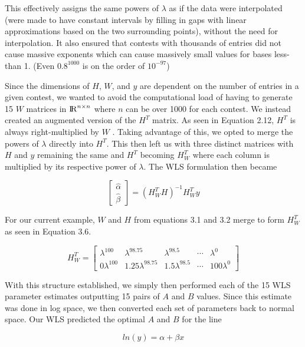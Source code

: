 This effectively assigns the same powers of $\lambda$ as if the data were interpolated (were made to have constant intervals by filling in gaps with linear approximations based on the two surrounding points), without the need for interpolation. It also ensured that contests with thousands of entries did not cause massive exponents which can cause massively small values for bases less-than 1. (Even $0.8^{1000}$ is on the order of $10^{-97}$)

Since the dimensions of $H$, $W$, and $y$ are dependent on the number of entries in a given contest, we wanted to avoid the computational load of having to generate 15 $W$ matrices in ${\rm I\!R}^{n \times n}$ where $n$ can be over 1000 for each contest. We instead created an augmented version of the $H^{T}$ matrix. As seen in Equation 2.12, $H^{T}$ is always right-multiplied by $W$ . Taking advantage of this, we opted to merge the powers of $\lambda$ directly into $H^{T}$. This then left us with three distinct matrices with $H$ and $y$ remaining the same and $H^{T}$ becoming $H_{W}^{T}$ where each column is multiplied by its respective power of $\lambda$. The WLS formulation then became

\begin{equation}
\begin{bmatrix}
\hat{\alpha} \\
\hat{\beta}
\end{bmatrix}
=
(H_{W}^{T}H)^{-1}H_{W}^{T}y
\end{equation}


For our current example, $W$ and $H$ from equations 3.1 and 3.2 merge to form $H_{W}^{T}$ as seen in Equation 3.6.

\begin{equation}
H_{W}^{T} = \begin{bmatrix}
        \lambda^{100} & \lambda^{98.75} & \lambda^{98.5} & \cdots & \lambda^{0} \\
        0\lambda^{100} & 1.25\lambda^{98.75} & 1.5\lambda^{98.5} & \cdots & 100\lambda^{0}
    \end{bmatrix}
\end{equation}

With this structure established, we simply then performed each of the 15 WLS parameter estimates outputting 15 pairs of $A$ and $B$ values. Since this estimate was done in log space, we then converted each set of parameters back to normal space. Our WLS predicted the optimal $A$ and $B$ for the line 

\begin{equation}
    ln(y) = \alpha + \beta x
\end{equation}

